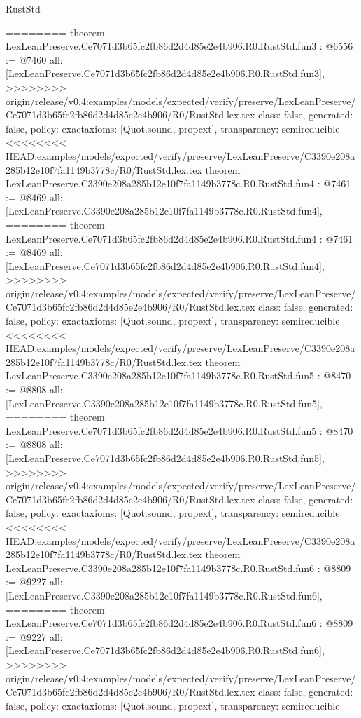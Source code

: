 \begin{lexlean}{RustStd}
\begin{coremodule}
{\begin{coremodule}
{{{{{{========
theorem LexLeanPreserve.Ce7071d3b65fc2fb86d2d4d85e2e4b906.R0.RustStd.fun3 : @6556 := @7460 {
  all: [LexLeanPreserve.Ce7071d3b65fc2fb86d2d4d85e2e4b906.R0.RustStd.fun3],
>>>>>>>> origin/release/v0.4:examples/models/expected/verify/preserve/LexLeanPreserve/Ce7071d3b65fc2fb86d2d4d85e2e4b906/R0/RustStd.lex.tex
  class: false,
  generated: false,
  policy: exact{axioms: [Quot.sound, propext]},
  transparency: semireducible
}
<<<<<<<< HEAD:examples/models/expected/verify/preserve/LexLeanPreserve/C3390e208a285b12e10f7fa1149b3778c/R0/RustStd.lex.tex
theorem LexLeanPreserve.C3390e208a285b12e10f7fa1149b3778c.R0.RustStd.fun4 : @7461 := @8469 {
  all: [LexLeanPreserve.C3390e208a285b12e10f7fa1149b3778c.R0.RustStd.fun4],
========
theorem LexLeanPreserve.Ce7071d3b65fc2fb86d2d4d85e2e4b906.R0.RustStd.fun4 : @7461 := @8469 {
  all: [LexLeanPreserve.Ce7071d3b65fc2fb86d2d4d85e2e4b906.R0.RustStd.fun4],
>>>>>>>> origin/release/v0.4:examples/models/expected/verify/preserve/LexLeanPreserve/Ce7071d3b65fc2fb86d2d4d85e2e4b906/R0/RustStd.lex.tex
  class: false,
  generated: false,
  policy: exact{axioms: [Quot.sound, propext]},
  transparency: semireducible
}
<<<<<<<< HEAD:examples/models/expected/verify/preserve/LexLeanPreserve/C3390e208a285b12e10f7fa1149b3778c/R0/RustStd.lex.tex
theorem LexLeanPreserve.C3390e208a285b12e10f7fa1149b3778c.R0.RustStd.fun5 : @8470 := @8808 {
  all: [LexLeanPreserve.C3390e208a285b12e10f7fa1149b3778c.R0.RustStd.fun5],
========
theorem LexLeanPreserve.Ce7071d3b65fc2fb86d2d4d85e2e4b906.R0.RustStd.fun5 : @8470 := @8808 {
  all: [LexLeanPreserve.Ce7071d3b65fc2fb86d2d4d85e2e4b906.R0.RustStd.fun5],
>>>>>>>> origin/release/v0.4:examples/models/expected/verify/preserve/LexLeanPreserve/Ce7071d3b65fc2fb86d2d4d85e2e4b906/R0/RustStd.lex.tex
  class: false,
  generated: false,
  policy: exact{axioms: [Quot.sound, propext]},
  transparency: semireducible
}
<<<<<<<< HEAD:examples/models/expected/verify/preserve/LexLeanPreserve/C3390e208a285b12e10f7fa1149b3778c/R0/RustStd.lex.tex
theorem LexLeanPreserve.C3390e208a285b12e10f7fa1149b3778c.R0.RustStd.fun6 : @8809 := @9227 {
  all: [LexLeanPreserve.C3390e208a285b12e10f7fa1149b3778c.R0.RustStd.fun6],
========
theorem LexLeanPreserve.Ce7071d3b65fc2fb86d2d4d85e2e4b906.R0.RustStd.fun6 : @8809 := @9227 {
  all: [LexLeanPreserve.Ce7071d3b65fc2fb86d2d4d85e2e4b906.R0.RustStd.fun6],
>>>>>>>> origin/release/v0.4:examples/models/expected/verify/preserve/LexLeanPreserve/Ce7071d3b65fc2fb86d2d4d85e2e4b906/R0/RustStd.lex.tex
  class: false,
  generated: false,
  policy: exact{axioms: [Quot.sound, propext]},
  transparency: semireducible
}}}}}}}}}}
\end{coremodule}}
\end{coremodule}
\end{lexlean}
